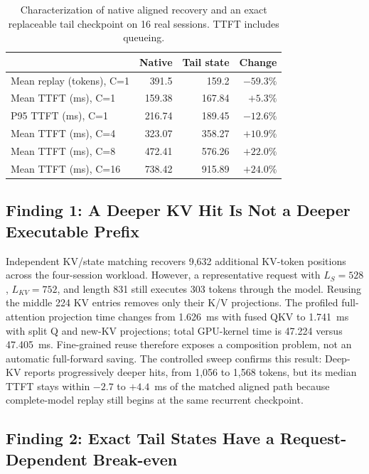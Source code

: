 \documentclass[sigconf,anonymous,review]{acmart}
\begin{document}
\begin{table}[t]
  \caption{Characterization of native aligned recovery and an exact
  replaceable tail checkpoint on 16 real sessions.  TTFT includes queueing.}
  \label{tab:motivation}
  \centering
  \small
  \begin{tabular}{lrrr}
    \toprule
    & Native & Tail state & Change \\
    \midrule
    Mean replay (tokens), C=1 & 391.5 & 159.2 & $-59.3\%$ \\
    Mean TTFT (ms), C=1       & 159.38 & 167.84 & $+5.3\%$ \\
    P95 TTFT (ms), C=1        & 216.74 & 189.45 & $-12.6\%$ \\
    Mean TTFT (ms), C=4       & 323.07 & 358.27 & $+10.9\%$ \\
    Mean TTFT (ms), C=8       & 472.41 & 576.26 & $+22.0\%$ \\
    Mean TTFT (ms), C=16      & 738.42 & 915.89 & $+24.0\%$ \\
    \bottomrule
  \end{tabular}
\end{table}

\subsection{Finding 1: A Deeper KV Hit Is Not a Deeper Executable Prefix}

Independent KV/state matching recovers 9,632 additional KV-token positions
across the four-session workload.  However, a representative request with
$L_S=528$, $L_{KV}=752$, and length 831 still executes 303 tokens through the
model.  Reusing the middle 224 KV entries removes only their K/V projections.
The profiled full-attention projection time changes from 1.626~ms with fused
QKV to 1.741~ms with split Q and new-KV projections; total GPU-kernel time is
47.224 versus 47.405~ms.  Fine-grained reuse therefore exposes a composition
problem, not an automatic full-forward saving.  The controlled sweep confirms
this result: Deep-KV reports progressively deeper hits, from 1,056 to 1,568
tokens, but its median TTFT stays within $-2.7$ to $+4.4$~ms of the matched
aligned path because complete-model replay still begins at the same recurrent
checkpoint.

\subsection{Finding 2: Exact Tail States Have a Request-Dependent Break-even}
\end{document}
